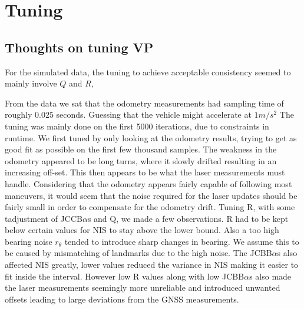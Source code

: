 \section{Tuning}\label{sec:tuning}


\subsection{Thoughts on tuning VP}

For the simulated data, the tuning to achieve acceptable consistency seemed to mainly
involve $Q$ and $R$, 

From the data we sat that the odometry measurements had sampling time of roughly $0.025$ seconds.
Guessing that the vehicle might accelerate at $1 m/s^2$
The tuning was mainly done on the first 5000 iterations, due to constraints
in runtime.
We first tuned by only looking at the odometry results,
trying to get as good fit as possible on the first few thousand samples.
The weakness in the odometry appeared to be long turns, 
where it slowly drifted resulting in an increasing off-set.
This then appears to be what the laser measurements must handle.
Considering that the odometry appears fairly capable of following most 
maneuvers, it would seem that the noise required for the laser
updates should be fairly small in order to compensate
for the odometry drift. Tuning R, with some tadjustment of JCCB$\alpha$s 
and Q, we made a few observations. R had to be kept below certain values 
for NIS to stay above the lower bound. Also a too high bearing noise $r_{\theta}$
tended to introduce sharp changes in bearing. 
We assume this to be caused by mismatching of landmarks due to the high noise.
The JCBB$\alpha$s also affected NIS greatly, lower values reduced the variance
in NIS making it easier to fit inside the interval. However low R values along
with low JCBB$\alpha$s also made the laser measurements seemingly more unreliable
and introduced unwanted offsets leading to large deviations from the GNSS measurements.


